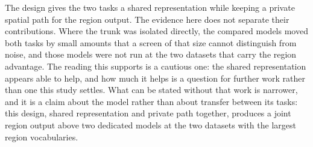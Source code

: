 The design gives the two tasks a shared representation while keeping a private spatial path for the
region output. The evidence here does not separate their contributions. Where the trunk was isolated
directly, the compared models moved both tasks by small amounts that a screen of that size cannot distinguish
from noise, and those models were not run at the two datasets that carry the region advantage. The
reading this supports is a cautious one: the shared representation appears able to help, and how much
it helps is a question for further work rather than one this study settles. What can be stated
without that work is narrower, and it is a claim about the model rather than about transfer between
its tasks: this design, shared representation and private path together, produces a joint region
output above two dedicated models at the two datasets with the largest region vocabularies.

